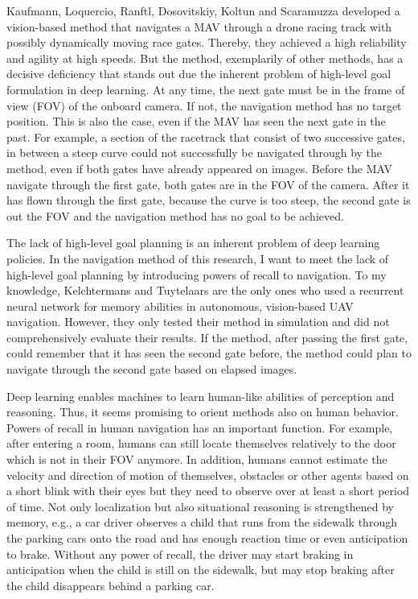 Kaufmann, Loquercio, Ranftl, Dosovitskiy, Koltun and Scaramuzza\cite{Kaufmann2018}
developed a vision-based method that navigates a MAV through a drone racing track with possibly dynamically moving race gates.
Thereby, they achieved a high reliability and agility at high speeds.
But the method, exemplarily of other methods, has a decisive deficiency that stands out 
due the inherent problem of high-level goal formulation in deep learning.
At any time, the next gate must be in the frame of view (FOV) of the onboard camera. 
If not, the navigation method has no target position.
This is also the case, even if the MAV has seen the next gate in the past.
For example, a section of the racetrack that consist of two successive gates, in between a steep curve
could not successfully be navigated through by the method, even if both gates have already appeared on images.
Before the MAV navigate through the first gate, both gates are in the FOV of the camera.
After it has flown through the first gate, because the curve is too steep, the second gate is out the FOV 
and the navigation method has no goal to be achieved.

The lack of high-level goal planning is an inherent problem of deep learning policies.
In the navigation method of this research, I want to meet the lack of high-level goal planning 
by introducing powers of recall to navigation.
To my knowledge, Kelchtermans and Tuytelaars \cite{Kelchtermans2017}
are the only ones who used a recurrent neural network for memory abilities in autonomous, vision-based UAV navigation. \cite{Shakeri2019}
However, they only tested their method in simulation and did not comprehensively evaluate their results.
If the method, after passing the first gate, could remember that it has seen the second gate before,
the method could plan to navigate through the second gate based on elapsed images.

Deep learning enables machines to learn human-like abilities of perception and reasoning.
Thus, it seems promising to orient methods also on human behavior.
Powers of recall in human navigation has an important function.
For example, after entering a room, humans can still locate themselves relatively to the door which is not in their FOV anymore.
In addition, humans cannot estimate the velocity and direction of motion of themselves, obstacles or other agents
based on a short blink with their eyes but they need to observe over at least a short period of time.
Not only localization but also situational reasoning is strengthened by memory,
e.g., a car driver observes a child that runs from the sidewalk through the parking cars onto the road
and has enough reaction time or even anticipation to brake.
Without any power of recall, the driver may start braking in anticipation
when the child is still on the sidewalk, but may stop braking after the child disappears behind a parking car.

